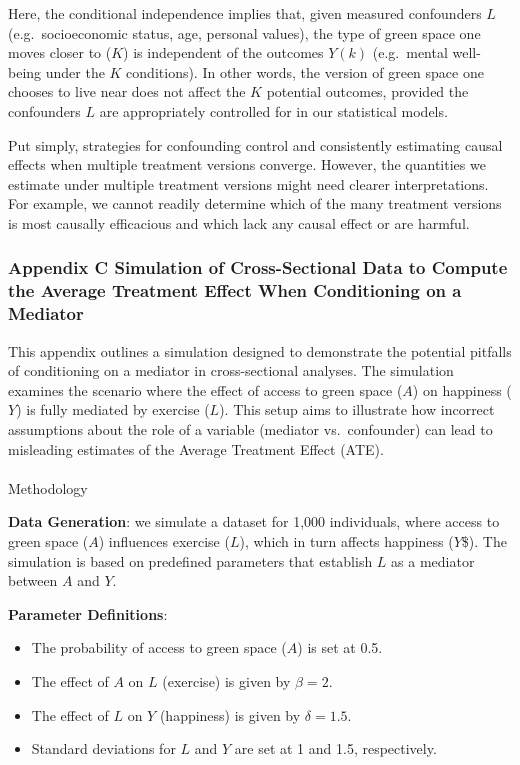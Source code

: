 \documentclass[
  singlecolumn]{article}
\makeatletter
\let\oldparagraph\paragraph
\renewcommand{\paragraph}{
    \@ifstar
      \xxxParagraphStar
      \xxxParagraphNoStar
  }
\newcommand{\xxxParagraphStar}[1]{\oldparagraph*{#1}\mbox{}}
\newcommand{\xxxParagraphNoStar}[1]{\oldparagraph{#1}\mbox{}}
\providecommand{\tightlist}{%
  \setlength{\itemsep}{0pt}\setlength{\parskip}{0pt}}\usepackage{longtable,booktabs,array}
\makeatother
\begin{document}
Here, the conditional independence implies that, given measured
confounders \(L\) (e.g.~socioeconomic status, age, personal values), the
type of green space one moves closer to (\(K\)) is independent of the
outcomes \(Y(k)\) (e.g.~mental well-being under the \(K\) conditions).
In other words, the version of green space one chooses to live near does
not affect the \(K\) potential outcomes, provided the confounders \(L\)
are appropriately controlled for in our statistical models.

Put simply, strategies for confounding control and consistently
estimating causal effects when multiple treatment versions converge.
However, the quantities we estimate under multiple treatment versions
might need clearer interpretations. For example, we cannot readily
determine which of the many treatment versions is most causally
efficacious and which lack any causal effect or are harmful.

\newpage{}

\subsubsection{Appendix C Simulation of Cross-Sectional Data to Compute
the Average Treatment Effect When Conditioning on a
Mediator}\label{appendix-c}

This appendix outlines a simulation designed to demonstrate the
potential pitfalls of conditioning on a mediator in cross-sectional
analyses. The simulation examines the scenario where the effect of
access to green space (\(A\)) on happiness (\(Y\)) is fully mediated by
exercise (\(L\)). This setup aims to illustrate how incorrect
assumptions about the role of a variable (mediator vs.~confounder) can
lead to misleading estimates of the Average Treatment Effect (ATE).

\paragraph{Methodology}\label{methodology}

\textbf{Data Generation}: we simulate a dataset for 1,000 individuals,
where access to green space (\(A\)) influences exercise (\(L\)), which
in turn affects happiness (\(Y\)\$). The simulation is based on
predefined parameters that establish \(L\) as a mediator between \(A\)
and \(Y\).

\textbf{Parameter Definitions}:

\begin{itemize}
\tightlist
\item
  The probability of access to green space (\(A\)) is set at 0.5.
\item
  The effect of \(A\) on \(L\) (exercise) is given by \(\beta = 2\).
\item
  The effect of \(L\) on \(Y\) (happiness) is given by \(\delta = 1.5\).
\item
  Standard deviations for \(L\) and \(Y\) are set at 1 and 1.5,
  respectively.
\end{itemize}
\end{document}
